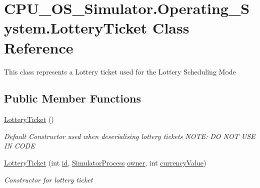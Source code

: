\hypertarget{class_c_p_u___o_s___simulator_1_1_operating___system_1_1_lottery_ticket}{}\section{C\+P\+U\+\_\+\+O\+S\+\_\+\+Simulator.\+Operating\+\_\+\+System.\+Lottery\+Ticket Class Reference}
\label{class_c_p_u___o_s___simulator_1_1_operating___system_1_1_lottery_ticket}


This class represents a Lottery ticket used for the Lottery Scheduling Mode  


\subsection*{Public Member Functions}
\begin{DoxyCompactItemize}
\item 
\hyperlink{class_c_p_u___o_s___simulator_1_1_operating___system_1_1_lottery_ticket_ae0d23e5357d910c2ee2cc8bd715face1}{Lottery\+Ticket} ()
\begin{DoxyCompactList}\small\item\em Default Constructor used when deserialising lottery tickets N\+O\+T\+E\+: D\+O N\+O\+T U\+S\+E I\+N C\+O\+D\+E \end{DoxyCompactList}\item 
\hyperlink{class_c_p_u___o_s___simulator_1_1_operating___system_1_1_lottery_ticket_a119f33191c10a46412927cf4e786f992}{Lottery\+Ticket} (int \hyperlink{class_c_p_u___o_s___simulator_1_1_operating___system_1_1_lottery_ticket_a66f775e493b834d9cfe753bc9961a935}{id}, \hyperlink{class_c_p_u___o_s___simulator_1_1_operating___system_1_1_simulator_process}{Simulator\+Process} \hyperlink{class_c_p_u___o_s___simulator_1_1_operating___system_1_1_lottery_ticket_a7b67cf29ab87500cc907a30357d858fd}{owner}, int \hyperlink{class_c_p_u___o_s___simulator_1_1_operating___system_1_1_lottery_ticket_a70221785d251a61ae812a60325287249}{currency\+Value})
\begin{DoxyCompactList}\small\item\em Constructor for lottery ticket \end{DoxyCompactList}\end{DoxyCompactItemize}
